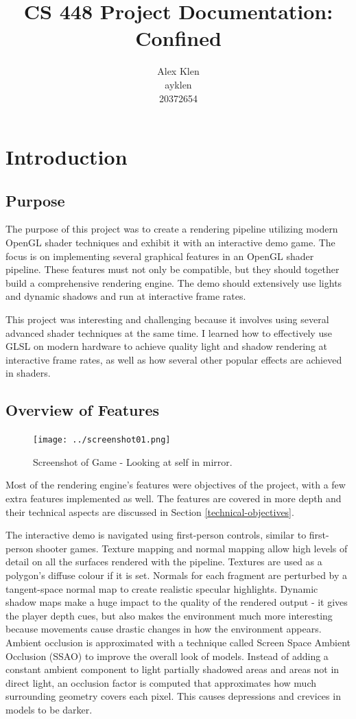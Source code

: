 \documentclass{book}
\title{\huge CS 448  Project Documentation: Confined}
\author{Alex Klen \\ ayklen \\ 20372654}
\begin{document}
\maketitle
\tableofcontents

\chapter{Introduction}
  \section{Purpose}
    The purpose of this project was to create a rendering pipeline utilizing modern OpenGL shader techniques and exhibit it with an interactive demo game.
    The focus is on implementing several graphical features in an OpenGL shader pipeline. These features must not only be compatible, but they should together build a comprehensive rendering engine.
    The demo should extensively use lights and dynamic shadows and run at interactive frame rates.

    This project was interesting and challenging because it involves using several advanced shader techniques at the same time. I learned how to effectively use GLSL on modern hardware to achieve quality light and shadow rendering at interactive frame rates, as well as how several other popular effects are achieved in shaders.

  \section{Overview of Features}
    \begin{figure}[h!]
      \centering
      \texttt{[image: ../screenshot01.png]}
      \caption{Screenshot of Game - Looking at self in mirror.}
      \label{screenshot01}
    \end{figure}

    Most of the rendering engine's features were objectives of the project, with a few extra features implemented as well. The features are covered in more depth and their technical aspects are discussed in Section \ref{technical-objectives}.

    The interactive demo is navigated using first-person controls, similar to first-person shooter games.
    Texture mapping and normal mapping allow high levels of detail on all the surfaces rendered with the pipeline. Textures are used as a polygon's diffuse colour if it is set. Normals for each fragment are perturbed by a tangent-space normal map to create realistic specular highlights.
    Dynamic shadow maps make a huge impact to the quality of the rendered output - it gives the player depth cues, but also makes the environment much more interesting because movements cause drastic changes in how the environment appears.
    Ambient occlusion is approximated with a technique called Screen Space Ambient Occlusion (SSAO) to improve the overall look of models. Instead of adding a constant ambient component to light partially shadowed areas and areas not in direct light, an occlusion factor is computed that approximates how much surrounding geometry covers each pixel. This causes depressions and crevices in models to be darker.
\end{document}
